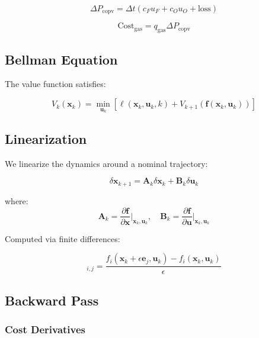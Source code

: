 \documentclass[11pt,a4paper]{article}
\begin{document}
\begin{equation}
\Delta P_{\text{copv}} = \Delta t \left(c_F u_F + c_O u_O + \text{loss}\right)
\end{equation}

\begin{equation}
\text{Cost}_{\text{gas}} = q_{\text{gas}} \Delta P_{\text{copv}}
\end{equation}

\subsection{Bellman Equation}

The value function satisfies:

\begin{equation}
V_k(\mathbf{x}_k) = \min_{\mathbf{u}_k} \left[\ell(\mathbf{x}_k, \mathbf{u}_k, k) + V_{k+1}(\mathbf{f}(\mathbf{x}_k, \mathbf{u}_k))\right]
\end{equation}

\subsection{Linearization}

We linearize the dynamics around a nominal trajectory:

\begin{equation}
\delta \mathbf{x}_{k+1} = \mathbf{A}_k \delta \mathbf{x}_k + \mathbf{B}_k \delta \mathbf{u}_k
\end{equation}

where:
\begin{equation}
\mathbf{A}_k = \frac{\partial \mathbf{f}}{\partial \mathbf{x}}\Big|_{\mathbf{x}_k, \mathbf{u}_k}, \quad \mathbf{B}_k = \frac{\partial \mathbf{f}}{\partial \mathbf{u}}\Big|_{\mathbf{x}_k, \mathbf{u}_k}
\end{equation}

Computed via finite differences:

\begin{equation}
[\mathbf{A}_k]_{i,j} = \frac{f_i(\mathbf{x}_k + \epsilon \mathbf{e}_j, \mathbf{u}_k) - f_i(\mathbf{x}_k, \mathbf{u}_k)}{\epsilon}
\end{equation}

\subsection{Backward Pass}

\subsubsection{Cost Derivatives}
\end{document}
